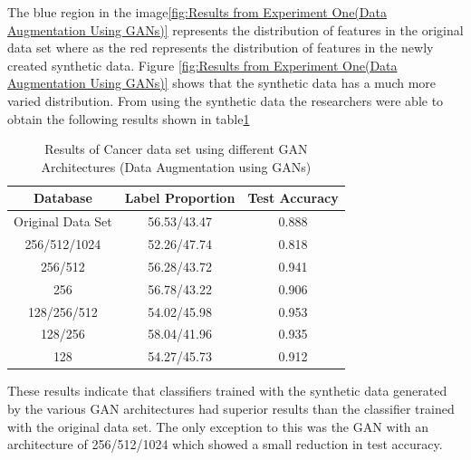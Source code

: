 \vspace{0.5mm}
The blue region in the image\ref{fig:Results from Experiment One(Data Augmentation Using GANs)} represents the distribution of features in the original data set where as the red represents the distribution of features in the newly created synthetic data. Figure \ref{fig:Results from Experiment One(Data Augmentation Using GANs)} shows that the synthetic data has a much more varied distribution.  From using the synthetic data the researchers were able to obtain the following results shown in table\ref{tab:Results and label distribution of Cancer Dataset using different GAN Architectures (Data Augmentation using GANs)}
\begin{table}[H]
    \centering
    \begin{tabular}{|c|c|c|}
    \hline
         Database
         & Label Proportion
         & Test Accuracy\\
    \hline
         Original Data Set & 56.53/43.47 & 0.888\\
         256/512/1024 & 52.26/47.74 & 0.818\\
         256/512 & 56.28/43.72 & 0.941\\
         256 & 56.78/43.22 & 0.906\\
         128/256/512 & 54.02/45.98 & 0.953\\
         128/256 & 58.04/41.96 & 0.935\\
         128 & 54.27/45.73 & 0.912\\
    \hline
    \end{tabular}
    \caption{Results of Cancer data set using different GAN Architectures (Data Augmentation using GANs)\cite{litReviewGanDataAugmentation}}
    \label{tab:Results and label distribution of Cancer Dataset using different GAN Architectures (Data Augmentation using GANs)}
\end{table}
These results indicate that classifiers trained with the synthetic data generated by the various GAN architectures had superior results than the classifier trained with the original data set.  The only exception to this was the GAN with an architecture of 256/512/1024 which showed a small reduction in test accuracy.
\\
